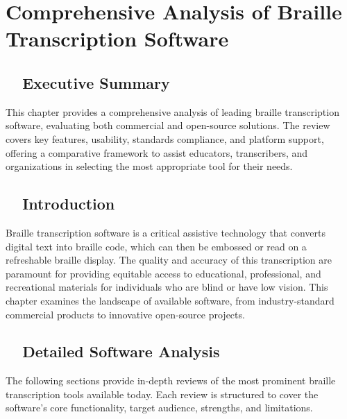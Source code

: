 \chapter{Comprehensive Analysis of Braille Transcription Software}
\label{cha:comprehensive-analysis-of-braille-transcription-software}

\section{~~Executive Summary}
\label{sec:executive-summary}

This chapter provides a comprehensive analysis of leading braille transcription software, evaluating both commercial and open-source solutions. The review covers key features, usability, standards compliance, and platform support, offering a comparative framework to assist educators, transcribers, and organizations in selecting the most appropriate tool for their needs.

\section{~~Introduction}
\label{sec:introduction}

Braille transcription software is a critical assistive technology that converts digital text into braille code, which can then be embossed or read on a refreshable braille display. The quality and accuracy of this transcription are paramount for providing equitable access to educational, professional, and recreational materials for individuals who are blind or have low vision. This chapter examines the landscape of available software, from industry-standard commercial products to innovative open-source projects.

\section{~~Detailed Software Analysis}
\label{sec:detailed-software-analysis}

The following sections provide in-depth reviews of the most prominent braille transcription tools available today. Each review is structured to cover the software's core functionality, target audience, strengths, and limitations.

